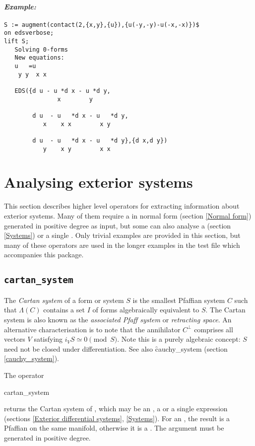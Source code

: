 \paragraph{\it Example:}
\begin{verbatim}
S := augment(contact(2,{x,y},{u}),{u(-y,-y)-u(-x,-x)})$
on edsverbose;
lift S;
   Solving 0-forms 
   New equations:  
   u   =u
    y y  x x  

   EDS({d u - u *d x - u *d y,
               x        y 

        d u  - u   *d x - u   *d y,
           x    x x        x y 

        d u  - u   *d x - u   *d y},{d x,d y})
           y    x y        x x 
\end{verbatim}



\section{Analysing exterior systems}
\label{Analysing exterior systems}

This section describes higher level operators for extracting information
about exterior systems. Many of them require a  in normal form
(section \ref{Normal form}) generated in positive degree as input, but some
can also analyse a  (section \ref{Systems}) or a single
. Only trivial examples are provided in this section, but many
of these operators are used in the longer examples in the test file which
accompanies this package.


\subsection{\tt cartan\_system}
\label{cartan_system}

The {\em Cartan system} of a form or system $S$ is the smallest Pfaffian
system $C$ such that $\Lambda(C)$ contains a set $I$ of forms algebraically
equivalent to $S$. The Cartan system is also known as the {\em associated
Pfaff system} or {\em retracting space}. An alternative characterisation is
to note that the annihilator $C^\perp$ comprises all vectors $V$ satisfying
$i_V S \simeq 0 \pmod{S}$.  Note this is a purely algebraic concept: $S$
need not be closed under differentiation. See also \f{cauchy\_system}
(section \ref{cauchy_system}).

The operator
\begin{syntax}
	cartan\_system 
\end{syntax}
returns the Cartan system of , which may be an , a
 or a single  expression (sections \ref{Exterior
differential systems}, \ref{Systems}). For an , the result is a
Pfaffian  on the same manifold, otherwise it is a
. The argument must be generated in positive degree.

